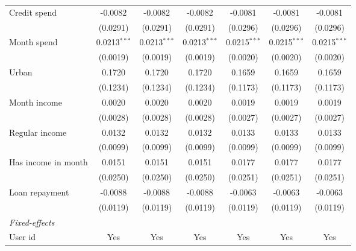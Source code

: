 \begin{table}[htbp]
\begin{threeparttable}[b]
\begin{tabular}{lcccccc}
         Credit spend            & -0.0082        & -0.0082        & -0.0082        & -0.0081        & -0.0081        & -0.0081\\   
                                 & (0.0291)       & (0.0291)       & (0.0291)       & (0.0296)       & (0.0296)       & (0.0296)\\   
         Month spend             & 0.0213$^{***}$ & 0.0213$^{***}$ & 0.0213$^{***}$ & 0.0215$^{***}$ & 0.0215$^{***}$ & 0.0215$^{***}$\\   
                                 & (0.0019)       & (0.0019)       & (0.0019)       & (0.0020)       & (0.0020)       & (0.0020)\\   
         Urban                   & 0.1720         & 0.1720         & 0.1720         & 0.1659         & 0.1659         & 0.1659\\   
                                 & (0.1234)       & (0.1234)       & (0.1234)       & (0.1173)       & (0.1173)       & (0.1173)\\   
         Month income            & 0.0020         & 0.0020         & 0.0020         & 0.0019         & 0.0019         & 0.0019\\   
                                 & (0.0028)       & (0.0028)       & (0.0028)       & (0.0027)       & (0.0027)       & (0.0027)\\   
         Regular income          & 0.0132         & 0.0132         & 0.0132         & 0.0133         & 0.0133         & 0.0133\\   
                                 & (0.0099)       & (0.0099)       & (0.0099)       & (0.0099)       & (0.0099)       & (0.0099)\\   
         Has income in month     & 0.0151         & 0.0151         & 0.0151         & 0.0177         & 0.0177         & 0.0177\\   
                                 & (0.0250)       & (0.0250)       & (0.0250)       & (0.0251)       & (0.0251)       & (0.0251)\\   
         Loan repayment          & -0.0088        & -0.0088        & -0.0088        & -0.0063        & -0.0063        & -0.0063\\   
                                 & (0.0119)       & (0.0119)       & (0.0119)       & (0.0119)       & (0.0119)       & (0.0119)\\   
         \midrule
         \emph{Fixed-effects}\\
         User id                 & Yes            & Yes            & Yes            & Yes            & Yes            & Yes\\  

\end{tabular}
\end{threeparttable}
\end{table}
